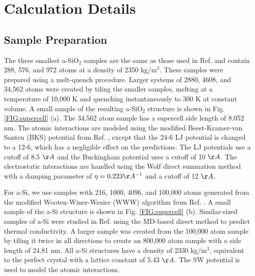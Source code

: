 \documentclass[aps,prb,onecolumn,preprint,superscriptaddress,footinbib,amsmath,amssymb,floatfix]{revtex4}
\begin{document}
\section{\label{S:Calculation}Calculation Details}

\subsection{\label{S:Sample}Sample Preparation}

The three smallest a-SiO$_2$ samples are the same as those used 
in Ref.  
and contain 288, 576, and 972 atoms at a density of 2350 kg/m$^3$. 
These samples were 
prepared using a melt-quench procedure. 
Larger systems of 2880, 4608, and 34,562 atoms were created by 
tiling the smaller samples, melting at a temperature of 10,000 K 
and quenching instantaneously to 300 K at constant volume. 
A small sample of the resulting a-SiO$_2$ structure is shown in 
Fig. \ref{FIG:supercell} (a). 
The 34,562 atom sample 
has a supercell side length of 8.052 nm. 
The atomic interactions are modeled using 
the modified Beest-Kramer-van Santen (BKS) potential
\cite{van_Beest_force_1990,kramer_interatomic_1991}
from Ref. 
, except that the 24-6 
LJ potential\cite{guissani_numerical_1996} 
is changed to a 12-6, 
which has a negligible effect on the predictions.  
The LJ potentials use a cutoff of 8.5 $\AA$ and the Buckingham 
potential uses a cutoff of 10 $\AA$. 
The electrostatic interactions are handled using the Wolf direct 
summation method with 
a damping parameter of $\eta=0.223 \AA^{-1}$ and a cutoff 
of 12 $\AA$.\cite{wolf_exact_1999} 

For a-Si, we use samples 
with 216, 1000, 4096, and 100,000 atoms generated from the 
modified Wooten-Winer-Weaire (WWW) algorithm 
from Ref. . 
A small sample of the a-Si structure is shown in 
Fig. \ref{FIG:supercell} (b). 
Similar-sized  
samples of a-Si were studied in Ref.  
using the 
MD-based direct method to predict thermal conductivity. 
A larger sample was created from the 100,000 atom sample 
by tiling it twice in all directions to create an 
800,000 atom sample with a side length of 24.81 nm.  
All a-Si structures have a density of 2330 kg/m$^3$, 
equivalent to the perfect 
crystal with a lattice constant of 5.43 $\AA$. 
The SW potential is used to model the atomic 
interactions.\cite{stillinger_computer_1985}   
\end{document}
